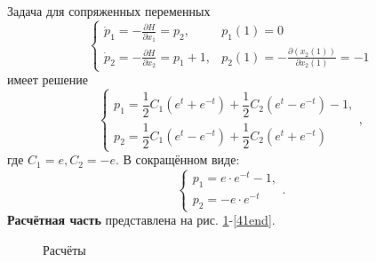 \documentclass[a4paper, 12pt]{article}
\newcommand{\df}[2]{\frac{\partial #1}{\partial #2}}
\begin{document}
Задача для сопряженных переменных
\begin{equation}
    \begin{cases}
        \dot p_1 = -\df{H}{x_1}=p_2, &p_1(1)=0\\
        \dot p_2=- \df{H}{x_2}=p_1+1, &p_2(1)=-\df{(x_2(1))}{x_2(1)}=-1
    \end{cases}
\end{equation}
имеет решение
\begin{equation}
    \begin{cases}
        p_1=\dfrac{1}{2}C_1 (e^t+e^{-t})+\dfrac{1}{2} C_2 (e^t-e^{-t})-1,\\
        p_2=\dfrac{1}{2}C_1 (e^t-e^{-t})+\dfrac{1}{2} C_2 (e^t+e^{-t})
    \end{cases},
\end{equation}
где $C_1=e,C_2=-e$. В сокращённом виде:
\begin{equation}
    \begin{cases}
        p_1=e \cdot e^{-t}-1,\\
        p_2=-e \cdot e^{-t}
    \end{cases}.
\end{equation}
{\bf Расчётная часть} представлена на рис. \ref{41beg}-\ref{41end}.
\begin{figure}[h]
    \noindent{}
    \caption{Расчёты}
    \label{41beg}
\end{figure}
\end{document}
